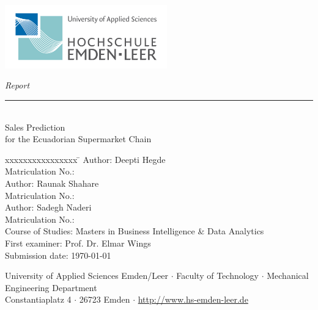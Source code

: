 %
%

\begin{titlepage}
    
    \begin{flushleft} 
        \includegraphics[width=7cm]{General/Logo.png}
    \end{flushleft} 
    
    \begin{flushright}
        \vspace{2cm}
        \LARGE \textsl{Report}\\
        \rule{0.6\textwidth}{0.4pt} ~\\
        \vspace{0.5cm}
        \textsf{\LARGE Sales Prediction}\\
        \textsf{\LARGE for the Ecuadorian Supermarket Chain}
    \end{flushright}
    
    \vspace{2cm}
    \begin{tabbing}
        xxxxxxxxxxxxxxxx \= \kill
        Author: \> Deepti Hegde \\
        Matriculation No.:  \\
        Author: \> Raunak Shahare \\
        Matriculation No.:  \\
        Author: \> Sadegh Naderi \\
        Matriculation No.:  \\
        Course of Studies: \> Masters in Business Intelligence \& Data Analytics  \\ [0.5cm]
        First examiner: \> Prof. Dr. Elmar Wings \\
        Submission date: \> \today \\
    \end{tabbing}
    
    \vspace{3cm}
    \small
    \begin{center}
        University of Applied Sciences Emden/Leer $\cdot$ 
        Faculty of Technology $\cdot$ 
        Mechanical Engineering Department \\
        Constantiaplatz 4 $\cdot$ 
        26723 Emden $\cdot$ 
        \url{http://www.hs-emden-leer.de}
    \end{center}
    
\end{titlepage}
